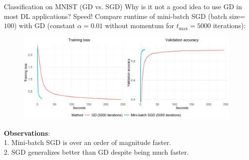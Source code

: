\documentclass[11pt,compress,t,notes=noshow, xcolor=table]{beamer}
\begin{document}
\begin{vbframe}{Classification on MNIST (GD vs. SGD)}
\vspace{-0.2cm}
Why is it not a good idea to use GD in most DL applications? Speed! Compare runtime of mini-batch SGD (batch size=$100$) with GD (constant $\alpha=0.01$ without momentum for $t_{\text{max}}=5000$ iterations):
\begin{figure}
            \includegraphics[width=1.0\textwidth]{slides/04-multivariate-first-order/figure_man/simu_mnist/SGD_GD_compar.pdf} \\
\end{figure} 
\textbf{Observations}:\\ 1. Mini-batch SGD is over an order of magnitude faster.\\
2. SGD generalizes better than GD despite being much faster. \\
\end{vbframe}



\endlecture
\end{document}
